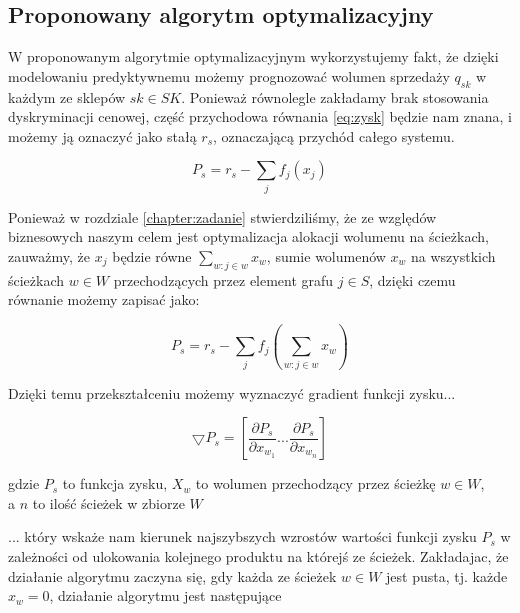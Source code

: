 \documentclass[polish, twoside, 12pt, a4paper]{article}
\theoremstyle{definition}
\theoremstyle{plain}
\theoremstyle{remark}
\begin{document}
\subsection{Proponowany algorytm optymalizacyjny} \label{chapter:algorytm}

W proponowanym algorytmie optymalizacyjnym wykorzystujemy fakt, że dzięki modelowaniu predyktywnemu możemy prognozować wolumen sprzedaży $q_{sk}$ w każdym ze sklepów $sk \in SK$. Ponieważ równolegle zakładamy brak stosowania dyskryminacji cenowej, część przychodowa równania \ref{eq:zysk} będzie nam znana, i możemy ją oznaczyć jako stałą $r_s$, oznaczającą  przychód całego systemu.  

\begin{equation} \label{eq:przychodsystemu}
P_s = r_s - \sum\limits_{j} f_j(x_j)
\end{equation}

Ponieważ w rozdziale \ref{chapter:zadanie} stwierdziliśmy, że ze względów biznesowych naszym celem jest optymalizacja alokacji wolumenu na ścieżkach, zauważmy, że $x_j$ będzie równe $\sum\limits_{w:j \in w} x_w$, sumie wolumenów $x_w$ na wszystkich ścieżkach $w \in W$ przechodzących przez element grafu $j \in S$, dzięki czemu równanie \label{eq:przychodsystemu} możemy zapisać jako: 

\begin{equation} \label{eq:przychodsystemu}
P_s = r_s - \sum\limits_{j} f_j(\sum\limits_{w:j \in w} x_w)
\end{equation}

Dzięki temu przekształceniu możemy wyznaczyć gradient funkcji zysku...

\begin{equation} \label{eq:gradient}
\bigtriangledown P_s  = [\frac{\partial P_s}{\partial x_{w_1}}...\frac{\partial P_s}{\partial x_{w_n}}]
\end{equation}
\begin{center} gdzie $P_s$ to funkcja zysku, $X_w$ to wolumen przechodzący przez ścieżkę $w \in W$, \\ a $n$ to ilość ścieżek w zbiorze $W$ \end{center}

... który wskaże nam kierunek najszybszych wzrostów wartości funkcji zysku $P_s$ w zależności od ulokowania kolejnego produktu na którejś ze ścieżek. Zakładajac, że działanie algorytmu zaczyna się, gdy każda ze ścieżek $w \in W$ jest pusta, tj. każde $x_{w}=0$, działanie algorytmu jest następujące
\end{document}

